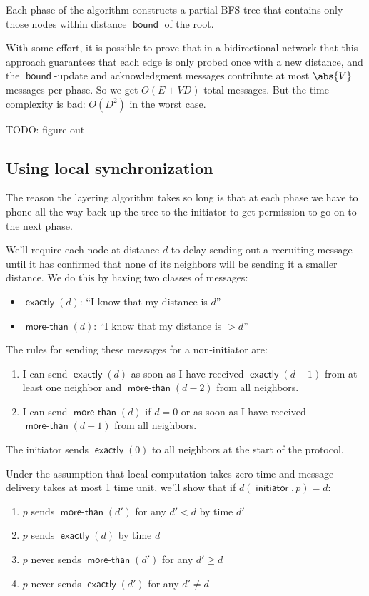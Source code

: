 \documentclass[11pt]{article}
\DeclareMathOperator{\initiator}{\textsf{initiator}}
\DeclareMathOperator{\bound}{\textsf{bound}}
\DeclareMathOperator{\exactly}{\textsf{exactly}}
\DeclareMathOperator{\morethan}{\textsf{more-than}}
\begin{document}
Each phase of the algorithm constructs a partial BFS tree that contains only those nodes within
distance \(\bound\) of the root.

With some effort, it is possible to prove that in a bidirectional network that this approach
guarantees that each edge is only probed once with a new distance, and the \(\bound\)-update and
acknowledgment messages contribute at most \(\abs{V}\) messages per phase. So we get \(O(E+VD)\) total
messages. But the time complexity is bad: \(O(D^2)\) in the worst case.

\label{Problem BFS} TODO: figure out
\subsection{Using local synchronization}
\label{sec:org6fcf6c3}
The reason the layering algorithm takes so long is that at each phase we have to phone all the way
back up the tree to the initiator to get permission to go on to the next phase.

We'll require each node at distance \(d\) to delay sending out a recruiting message until it has confirmed
that none of its neighbors will be sending it a smaller distance. We do this by having two classes of
messages:
\begin{itemize}
\item \(\exactly(d)\): ``I know that my distance is \(d\)''
\item \(\morethan(d)\): ``I know that my distance is \(>d\)''
\end{itemize}
The rules for sending these messages for a non-initiator are:
\begin{enumerate}
\item I can send \(\exactly(d)\) as soon as I have received \(\exactly(d-1)\) from at least one neighbor
and \(\morethan(d-2)\) from all neighbors.
\item I can send \(\morethan(d)\) if \(d=0\) or as soon as I have received \(\morethan(d-1)\) from all
neighbors.
\end{enumerate}

The initiator sends \(\exactly(0)\) to all neighbors at the start of the protocol.

\begin{proposition}[]
Under the assumption that local computation takes zero time and message delivery takes at most 1 time
unit, we'll show that if \(d(\initiator,p)=d\):
\begin{enumerate}
\item \(p\) sends \(\morethan(d')\) for any \(d'<d\) by time \(d'\)
\item \(p\) sends \(\exactly(d)\) by time \(d\)
\item \(p\) never sends \(\morethan(d')\) for any \(d'\ge d\)
\item \(p\) never sends \(\exactly(d')\) for any \(d'\neq d\)
\end{enumerate}
\end{proposition}
\end{document}
